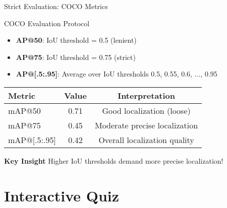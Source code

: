 \documentclass[usenames,dvipsnames]{beamer}
\begin{document}
\begin{frame}{Strict Evaluation: COCO Metrics}
	\begin{definitionbox}{COCO Evaluation Protocol}
		\begin{itemize}
			\item \textbf{AP@50}: IoU threshold = 0.5 (lenient)
			\item \textbf{AP@75}: IoU threshold = 0.75 (strict)  
			\item \textbf{AP@[.5:.95]}: Average over IoU thresholds 0.5, 0.55, 0.6, ..., 0.95
		\end{itemize}
	\end{definitionbox}
	
	\vspace{1em}
	\begin{center}
	\begin{tabular}{|l|c|c|}
	\hline
	\textbf{Metric} & \textbf{Value} & \textbf{Interpretation} \\
	\hline
	mAP@50 & 0.71 & Good localization (loose) \\
	\hline
	mAP@75 & 0.45 & Moderate precise localization \\
	\hline
	mAP@[.5:.95] & 0.42 & Overall localization quality \\
	\hline
	\end{tabular}
	\end{center}
	
	\begin{keypointsbox}
	\textbf{Key Insight}
	Higher IoU thresholds demand more precise localization!
	\end{keypointsbox}
\end{frame}


\section{Interactive Quiz}
\end{document}
